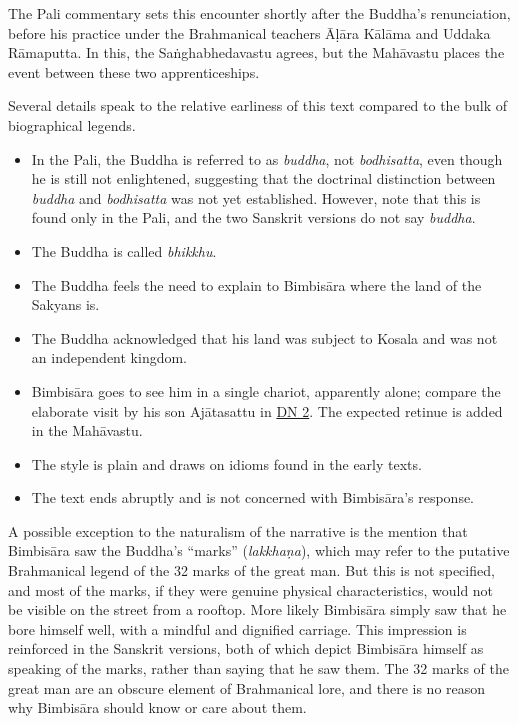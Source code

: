 \documentclass[12pt,openany]{book}%
\begin{document}
The Pali commentary sets this encounter shortly after the Buddha’s renunciation, before his practice under the Brahmanical teachers \textsanskrit{Āḷāra} \textsanskrit{Kālāma} and Uddaka \textsanskrit{Rāmaputta}. In this, the \textsanskrit{Saṅghabhedavastu} agrees, but the \textsanskrit{Mahāvastu} places the event between these two apprenticeships.

Several details speak to the relative earliness of this text compared to the bulk of biographical legends.

\begin{itemize}%
\item In the Pali, the Buddha is referred to as \textit{buddha}, not \textit{bodhisatta}, even though he is still not enlightened, suggesting that the doctrinal distinction between \textit{buddha} and \textit{bodhisatta} was not yet established. However, note that this is found only in the Pali, and the two Sanskrit versions do not say \textit{buddha}.%
\item The Buddha is called \textit{bhikkhu}.%
\item The Buddha feels the need to explain to \textsanskrit{Bimbisāra} where the land of the Sakyans is.%
\item The Buddha acknowledged that his land was subject to Kosala and was not an independent kingdom.%
\item \textsanskrit{Bimbisāra} goes to see him in a single chariot, apparently alone; compare the elaborate visit by his son \textsanskrit{Ajātasattu} in \href{https://suttacentral.net/dn2/en/sujato}{DN 2}. The expected retinue is added in the \textsanskrit{Mahāvastu}.%
\item The style is plain and draws on idioms found in the early texts.%
\item The text ends abruptly and is not concerned with \textsanskrit{Bimbisāra}’s response.%
\end{itemize}

A possible exception to the naturalism of the narrative is the mention that \textsanskrit{Bimbisāra} saw the Buddha’s “marks” (\textit{\textsanskrit{lakkhaṇa}}), which may refer to the putative Brahmanical legend of the 32 marks of the great man. But this is not specified, and most of the marks, if they were genuine physical characteristics, would not be visible on the street from a rooftop. More likely \textsanskrit{Bimbisāra} simply saw that he bore himself well, with a mindful and dignified carriage. This impression is reinforced in the Sanskrit versions, both of which depict \textsanskrit{Bimbisāra} himself as speaking of the marks, rather than saying that he saw them. The 32 marks of the great man are an obscure element of Brahmanical lore, and there is no reason why \textsanskrit{Bimbisāra} should know or care about them.
\end{document}
